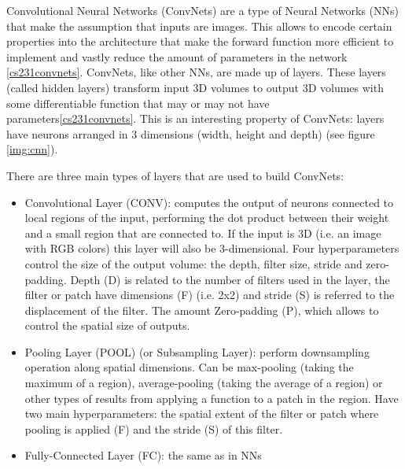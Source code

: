 \documentclass[]{article}
\begin{document}
Convolutional Neural Networks (ConvNets) are a type of Neural Networks (NNs) that make the assumption that inputs are images. This allows to encode certain properties into the architecture that make the forward function more efficient to implement and vastly reduce the amount of parameters in the network \ref{cs231convnets}.
ConvNets, like other NNs, are made up of layers. These layers (called hidden layers) transform input 3D volumes to output 3D volumes with some differentiable function that may or may not have parameters\ref{cs231convnets}. This is an interesting property of ConvNets: layers have neurons arranged in 3 dimensions (width, height and depth) (see figure \ref{img:cnn}). %

There are three main types of layers that are used to build ConvNets: %
\begin{itemize}
	\item Convolutional Layer (CONV): computes the output of neurons connected to local regions of the input, performing the dot product between their weight and a small region that are connected to. If the input is 3D (i.e. an image with RGB colors) this layer will also be 3-dimensional. Four hyperparameters control the size of the output volume: the depth, filter size, stride and zero-padding. Depth (D) is related to the number of filters used in the layer, the filter or patch have dimensions (F) (i.e. 2x2) and stride (S) is referred to the displacement of the filter. The amount Zero-padding (P), which allows to control the spatial size of outputs.
	\item Pooling Layer (POOL) (or Subsampling Layer): perform downsampling operation along spatial dimensions. Can be max-pooling (taking the maximum of a region), average-pooling (taking the average of a region) or other types of results from applying a function to a patch in the region. Have two main hyperparameters: the spatial extent of the filter or patch where pooling is applied (F) and the stride (S) of this filter.
	\item Fully-Connected Layer (FC): the same as in NNs
\end{itemize}
\end{document}
